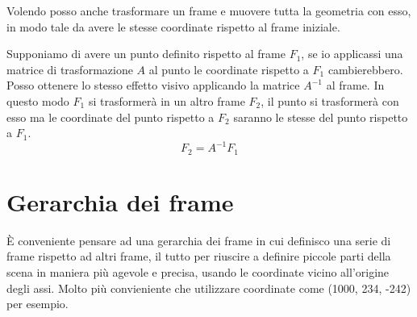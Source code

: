 Volendo posso anche trasformare un frame e muovere tutta la geometria con esso, in modo tale
da avere le stesse coordinate rispetto al frame iniziale.

Supponiamo di avere un punto definito rispetto al frame $F_1$, se io applicassi una matrice
di trasformazione $A$ al punto le coordinate rispetto a $F_1$ cambierebbero. Posso ottenere
lo stesso effetto visivo applicando la matrice $A^{-1}$ al frame. In questo modo $F_1$
si trasformer\`a in un altro frame $F_2$, il punto si trasformer\`a con esso ma le
coordinate del punto rispetto a $F_2$ saranno le stesse del punto rispetto a $F_1$.
\[ F_2 = A^{-1} F_1 \]

\section{Gerarchia dei frame}
\`E conveniente pensare ad una gerarchia dei frame in cui definisco una serie di frame
rispetto ad altri frame, il tutto per riuscire a definire piccole parti della scena
in maniera pi\`u agevole e precisa, usando le coordinate vicino all'origine degli assi.
Molto pi\`u convieniente che utilizzare coordinate come (1000, 234, -242) per esempio.